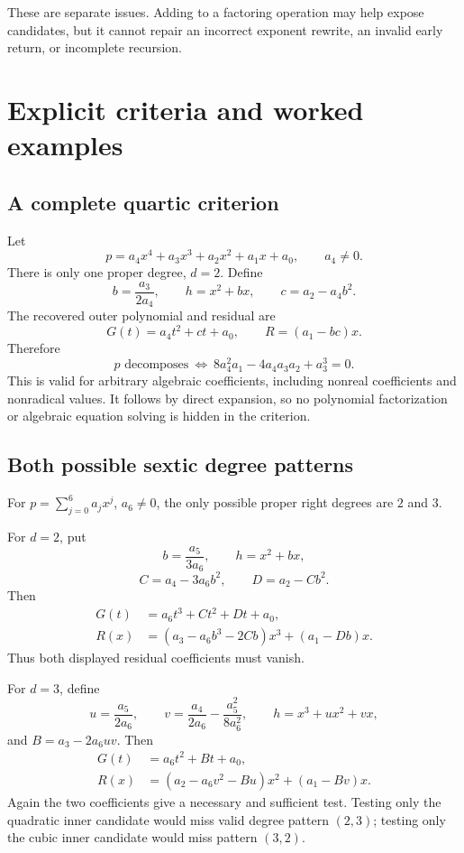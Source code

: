 \documentclass[11pt,a4paper]{article}
\theoremstyle{definition}
\newcommand{\code}[1]{\texttt{\detokenize{#1}}}
\begin{document}
These are separate issues. Adding \code{Extension} to a factoring operation may help expose candidates, but it cannot repair an incorrect exponent rewrite, an invalid early return, or incomplete recursion.

\section{Explicit criteria and worked examples}
\subsection{A complete quartic criterion}
Let
\[
 p=a_4x^4+a_3x^3+a_2x^2+a_1x+a_0,\qquad a_4\ne0.
\]
There is only one proper degree, $d=2$. Define
\[
 b=\frac{a_3}{2a_4},\qquad h=x^2+bx,\qquad
 c=a_2-a_4b^2.
\]
The recovered outer polynomial and residual are
\[
 G(t)=a_4t^2+ct+a_0,\qquad R=(a_1-bc)x.
\]
Therefore
\begin{equation}
 \boxed{p\text{ decomposes}\ \Longleftrightarrow\
 8a_4^2a_1-4a_4a_3a_2+a_3^3=0.}\label{eq:quartic}
\end{equation}
This is valid for arbitrary algebraic coefficients, including nonreal coefficients and nonradical \code{Root} values. It follows by direct expansion, so no polynomial factorization or algebraic equation solving is hidden in the criterion.

\subsection{Both possible sextic degree patterns}
For $p=\sum_{j=0}^6a_jx^j$, $a_6\ne0$, the only possible proper right degrees are $2$ and $3$.

For $d=2$, put
\[
 b=\frac{a_5}{3a_6},\qquad h=x^2+bx,
\]
\[
 C=a_4-3a_6b^2,\qquad D=a_2-Cb^2.
\]
Then
\begin{align*}
 G(t)&=a_6t^3+Ct^2+Dt+a_0,\\
 R(x)&=(a_3-a_6b^3-2Cb)x^3+(a_1-Db)x.
\end{align*}
Thus both displayed residual coefficients must vanish.

For $d=3$, define
\[
 u=\frac{a_5}{2a_6},\qquad
 v=\frac{a_4}{2a_6}-\frac{a_5^2}{8a_6^2},\qquad h=x^3+ux^2+vx,
\]
and $B=a_3-2a_6uv$. Then
\begin{align*}
 G(t)&=a_6t^2+Bt+a_0,\\
 R(x)&=(a_2-a_6v^2-Bu)x^2+(a_1-Bv)x.
\end{align*}
Again the two coefficients give a necessary and sufficient test. Testing only the quadratic inner candidate would miss valid degree pattern $(2,3)$; testing only the cubic inner candidate would miss pattern $(3,2)$.
\end{document}
